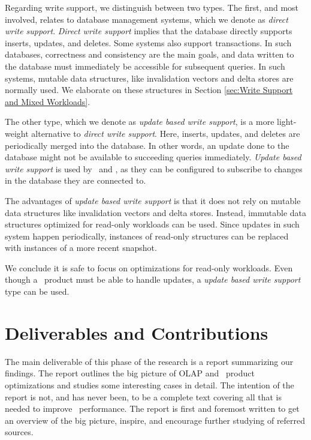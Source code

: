 {

Regarding write support, we distinguish between two types. The first, and most involved, relates to database management systems, which we denote as \textit{direct write support}. \textit{Direct write support} implies that the database directly supports inserts, updates, and deletes. Some systems also support transactions. In such databases, correctness and consistency are the main goals, and data written to the database must immediately be accessible for subsequent queries. In such systems, mutable data structures, like invalidation vectors and delta stores are normally used. We elaborate on these structures in Section \ref{sec:Write Support and Mixed Workloads}.


The other type, which we denote as \textit{update based write support}, is a more light-weight alternative to \textit{direct write support}. Here, inserts, updates, and deletes are periodically merged into the database. In other words, an update done to the database might not be available to succeeding queries immediately. \textit{Update based write support} is used by \qlikview~and \tableau {}, as they can be configured to subscribe to changes in the database they are connected to.

The advantages of \textit{update based write support} is that it does not rely on mutable data structures like invalidation vectors and delta stores. Instead, immutable data structures optimized for read-only workloads can be used. Since updates in such system happen periodically, instances of read-only structures can be replaced with instances of a more recent snapshot.

We conclude it is safe to focus on optimizations for read-only workloads. Even though a \bd~product must be able to handle updates, a \textit{update based write support} type can be used.



\section{Deliverables and Contributions}
\label{sec:Deliverables and Contributions}

The main deliverable of this phase of the research is a report summarizing our findings. The report outlines the big picture of OLAP and \bd~product optimizations and studies some interesting cases in detail. The intention of the report is not, and has never been, to be a complete text covering all that is needed to improve \bd~performance. The report is first and foremost written to get an overview of the big picture, inspire, and encourage further studying of referred sources. 

}
